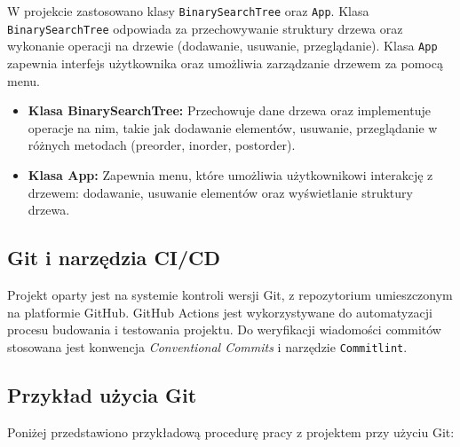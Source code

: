 W projekcie zastosowano klasy \texttt{BinarySearchTree} oraz \texttt{App}. Klasa \texttt{BinarySearchTree} odpowiada za przechowywanie struktury drzewa oraz wykonanie operacji na drzewie (dodawanie, usuwanie, przeglądanie). Klasa \texttt{App} zapewnia interfejs użytkownika oraz umożliwia zarządzanie drzewem za pomocą menu.

\begin{itemize}
	\item \textbf{Klasa BinarySearchTree:} Przechowuje dane drzewa oraz implementuje operacje na nim, takie jak dodawanie elementów, usuwanie, przeglądanie w różnych metodach (preorder, inorder, postorder).
	\item \textbf{Klasa App:} Zapewnia menu, które umożliwia użytkownikowi interakcję z drzewem: dodawanie, usuwanie elementów oraz wyświetlanie struktury drzewa.
\end{itemize}

\subsection{Git i narzędzia CI/CD}

Projekt oparty jest na systemie kontroli wersji Git, z repozytorium umieszczonym na platformie GitHub. GitHub Actions jest wykorzystywane do automatyzacji procesu budowania i testowania projektu. Do weryfikacji wiadomości commitów stosowana jest konwencja \textit{Conventional Commits} i narzędzie \texttt{Commitlint}.

\subsection{Przykład użycia Git}

Poniżej przedstawiono przykładową procedurę pracy z projektem przy użyciu Git:

